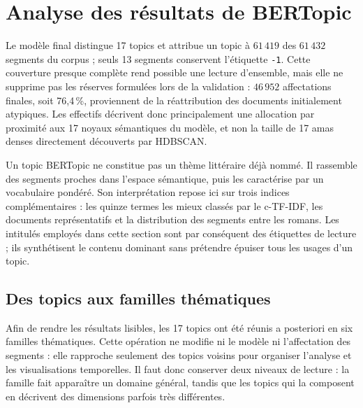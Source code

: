 \section{Analyse des résultats de BERTopic}

Le modèle final distingue 17 topics et attribue un topic à \(61\,419\) des \(61\,432\) segments du corpus ; seuls 13 segments conservent l'étiquette \texttt{-1}. Cette couverture presque complète rend possible une lecture d'ensemble, mais elle ne supprime pas les réserves formulées lors de la validation : \(46\,952\) affectations finales, soit 76,4\,\%, proviennent de la réattribution des documents initialement atypiques. Les effectifs décrivent donc principalement une allocation par proximité aux 17 noyaux sémantiques du modèle, et non la taille de 17 amas denses directement découverts par HDBSCAN.

Un topic BERTopic ne constitue pas un thème littéraire déjà nommé. Il rassemble des segments proches dans l'espace sémantique, puis les caractérise par un vocabulaire pondéré. Son interprétation repose ici sur trois indices complémentaires : les quinze termes les mieux classés par le c-TF-IDF, les documents représentatifs et la distribution des segments entre les romans. Les intitulés employés dans cette section sont par conséquent des étiquettes de lecture ; ils synthétisent le contenu dominant sans prétendre épuiser tous les usages d'un topic.

\subsection{Des topics aux familles thématiques}

Afin de rendre les résultats lisibles, les 17 topics ont été réunis a posteriori en six familles thématiques. Cette opération ne modifie ni le modèle ni l'affectation des segments : elle rapproche seulement des topics voisins pour organiser l'analyse et les visualisations temporelles. Il faut donc conserver deux niveaux de lecture : la famille fait apparaître un domaine général, tandis que les topics qui la composent en décrivent des dimensions parfois très différentes.

